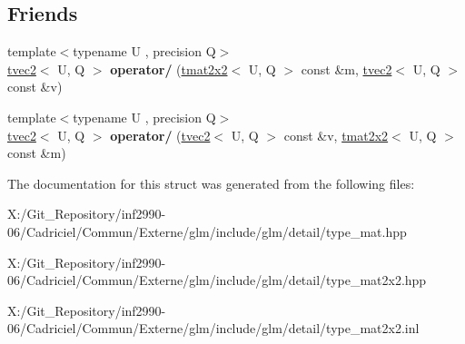 \subsection*{Friends}
\begin{DoxyCompactItemize}
\item 
\hypertarget{structglm_1_1detail_1_1tmat2x2_a6d8b6618f8e231cea3dec1d6b21d7de3}{{\footnotesize template$<$typename U , precision Q$>$ }\\\hyperlink{structglm_1_1detail_1_1tvec2}{tvec2}$<$ U, Q $>$ {\bfseries operator/} (\hyperlink{structglm_1_1detail_1_1tmat2x2}{tmat2x2}$<$ U, Q $>$ const \&m, \hyperlink{structglm_1_1detail_1_1tvec2}{tvec2}$<$ U, Q $>$ const \&v)}\label{structglm_1_1detail_1_1tmat2x2_a6d8b6618f8e231cea3dec1d6b21d7de3}

\item 
\hypertarget{structglm_1_1detail_1_1tmat2x2_af5138f235b2448c769a37e7d222a5ab6}{{\footnotesize template$<$typename U , precision Q$>$ }\\\hyperlink{structglm_1_1detail_1_1tvec2}{tvec2}$<$ U, Q $>$ {\bfseries operator/} (\hyperlink{structglm_1_1detail_1_1tvec2}{tvec2}$<$ U, Q $>$ const \&v, \hyperlink{structglm_1_1detail_1_1tmat2x2}{tmat2x2}$<$ U, Q $>$ const \&m)}\label{structglm_1_1detail_1_1tmat2x2_af5138f235b2448c769a37e7d222a5ab6}

\end{DoxyCompactItemize}


The documentation for this struct was generated from the following files\-:\begin{DoxyCompactItemize}
\item 
X\-:/\-Git\-\_\-\-Repository/inf2990-\/06/\-Cadriciel/\-Commun/\-Externe/glm/include/glm/detail/type\-\_\-mat.\-hpp\item 
X\-:/\-Git\-\_\-\-Repository/inf2990-\/06/\-Cadriciel/\-Commun/\-Externe/glm/include/glm/detail/type\-\_\-mat2x2.\-hpp\item 
X\-:/\-Git\-\_\-\-Repository/inf2990-\/06/\-Cadriciel/\-Commun/\-Externe/glm/include/glm/detail/type\-\_\-mat2x2.\-inl\end{DoxyCompactItemize}
